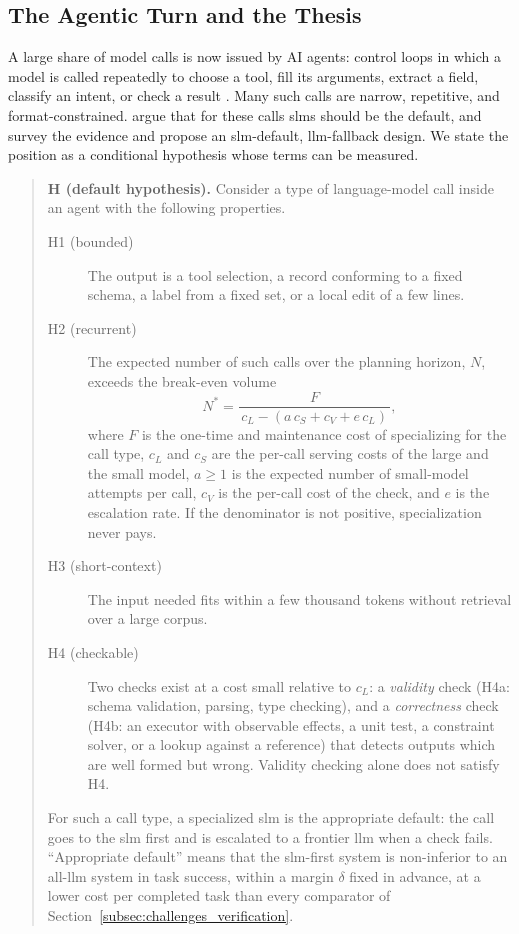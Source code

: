 \subsection{The Agentic Turn and the Thesis}
\label{subsec:intro_agentic}
\label{subsec:intro_thesis}

A large share of model calls is now issued by AI agents: control loops in which a model is called repeatedly to choose a tool, fill its arguments, extract a field, classify an intent, or check a result \citep{belcak2025slm_agentic,chen2024mas_survey}. Many such calls are narrow, repetitive, and format-constrained. \citet{belcak2025slm_agentic} argue that for these calls \glspl{slm} should be the default, and \citet{sharma2025slm_agentic} survey the evidence and propose an \gls{slm}-default, \gls{llm}-fallback design. We state the position as a conditional hypothesis whose terms can be measured.

\begin{quote}
\textbf{H (default hypothesis).} Consider a type of language-model call inside an agent with the following properties.
\begin{description}
  \item[H1 (bounded)] The output is a tool selection, a record conforming to a fixed schema, a label from a fixed set, or a local edit of a few lines.
  \item[H2 (recurrent)] The expected number of such calls over the planning horizon, $N$, exceeds the break-even volume
  \begin{equation}
    N^{*} = \frac{F}{\,c_L - (a\,c_S + c_V + e\,c_L)\,},
    \label{eq:breakeven}
  \end{equation}
  where $F$ is the one-time and maintenance cost of specializing for the call type, $c_L$ and $c_S$ are the per-call serving costs of the large and the small model, $a \ge 1$ is the expected number of small-model attempts per call, $c_V$ is the per-call cost of the check, and $e$ is the escalation rate. If the denominator is not positive, specialization never pays.
  \item[H3 (short-context)] The input needed fits within a few thousand tokens without retrieval over a large corpus.
  \item[H4 (checkable)] Two checks exist at a cost small relative to $c_L$: a \emph{validity} check (H4a: schema validation, parsing, type checking), and a \emph{correctness} check (H4b: an executor with observable effects, a unit test, a constraint solver, or a lookup against a reference) that detects outputs which are well formed but wrong. Validity checking alone does not satisfy H4.
\end{description}
For such a call type, a specialized \gls{slm} is the appropriate default: the call goes to the \gls{slm} first and is escalated to a frontier \gls{llm} when a check fails. ``Appropriate default'' means that the \gls{slm}-first system is non-inferior to an all-\gls{llm} system in task success, within a margin $\delta$ fixed in advance, at a lower cost per completed task than every comparator of Section~\ref{subsec:challenges_verification}.
\end{quote}

